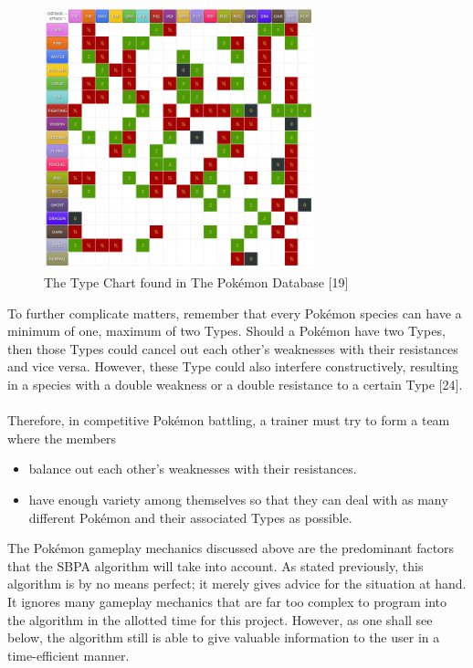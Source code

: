 \documentclass{article}
\begin{document}
\begin{figure}[H]
	\includegraphics[width=0.7\textwidth]{TypeChart.png}
	\centering
	\caption{The Type Chart found in The Pok\'emon Database [19]}
\end{figure}
To further complicate matters, remember that every Pok\'emon species can have a minimum of one, maximum of two Types. Should a Pok\'emon have two Types, then those Types could cancel out each other's weaknesses with their resistances and vice versa. However, these Type could also interfere constructively, resulting in a species with a double weakness or a double resistance to a certain Type [24].\\\\
Therefore, in competitive Pok\'emon battling, a trainer must try to form a team where the members
\begin{itemize}
	\item balance out each other's weaknesses with their resistances.
	\item have enough variety among themselves so that they can deal with as many different Pok\'emon and their associated Types as possible.
\end{itemize}
The Pok\'emon gameplay mechanics discussed above are the predominant factors that the SBPA algorithm will take into account. As stated previously, this algorithm is by no means perfect; it merely gives advice for the situation at hand. It ignores many gameplay mechanics that are far too complex to program into the algorithm in the allotted time for this project. However, as one shall see below, the algorithm still is able to give valuable information to the user in a time-efficient manner.
\end{document}
